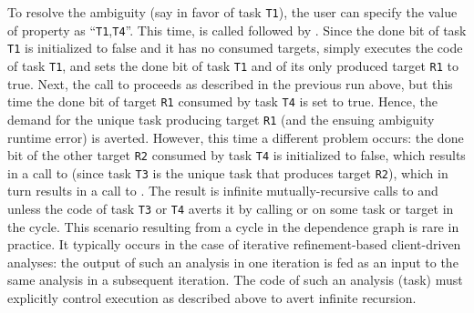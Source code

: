 To resolve the ambiguity (say in favor of task {\tt T1}), the user can
specify the value of property  as ``{\tt T1},{\tt T4}''.  This
time,  is called followed by .
Since the done bit of task {\tt T1} is initialized to false and it has no consumed
targets,  simply executes the code of task {\tt T1}, and sets
the done bit of task {\tt T1} and of its only produced target {\tt R1} to true.
Next, the call to  proceeds as described in the previous run
above, but this time the done bit of target {\tt R1} consumed by task {\tt T4} is
set to true.  Hence, the demand for the unique task producing target {\tt R1} (and
the ensuing ambiguity runtime error) is averted.  However, this time a different
problem occurs: the done bit of the other target {\tt R2} consumed by task {\tt T4} is
initialized to false, which results in a call to 
(since task {\tt T3} is the unique task that produces target {\tt R2}), which in turn
results in a call to .  The result is infinite 
mutually-recursive calls to  and  unless the
code of task {\tt T3} or {\tt T4} averts it by
calling  or  on some task or target
in the cycle.
This scenario resulting from a cycle in the dependence graph is rare in practice.
It typically occurs in the case of iterative refinement-based client-driven analyses:
the output of such an analysis in one iteration is fed as an input to the same analysis
in a subsequent iteration.  The code of such an analysis (task) must explicitly
control execution as described above to avert infinite recursion.

